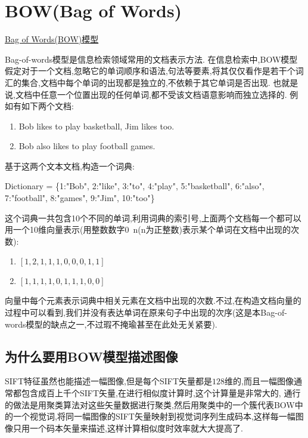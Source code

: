 \section{BOW(Bag of Words)}
\href{https://www.douban.com/note/310140053/}{Bag of Words(BOW)模型}

Bag-of-words模型是信息检索领域常用的文档表示方法. 在信息检索中,BOW模型假定对于一个文档,忽略它的单词顺序和语法,句法等要素,将其仅仅看作是若干个词汇的集合,文档中每个单词的出现都是独立的,不依赖于其它单词是否出现.
也就是说,文档中任意一个位置出现的任何单词,都不受该文档语意影响而独立选择的.
例如有如下两个文档:
\begin{enumerate}
	\item Bob likes to play basketball, Jim likes too.
	\item Bob also likes to play football games.
\end{enumerate}
基于这两个文本文档,构造一个词典:

Dictionary = \{1:"Bob", 2:"like", 3:"to", 4:"play", 5:"basketball", 6:"also", 7:"football", 8:"games", 9:"Jim", 10:"too"\}
 
这个词典一共包含10个不同的单词,利用词典的索引号,上面两个文档每一个都可以用一个10维向量表示(用整数数字0~n(n为正整数)表示某个单词在文档中出现的次数):
 
\begin{enumerate}
	\item $[1, 2, 1, 1, 1, 0, 0, 0, 1, 1]$
	\item $[1, 1, 1, 1 ,0, 1, 1, 1, 0, 0]$
\end{enumerate}
 
向量中每个元素表示词典中相关元素在文档中出现的次数.不过,在构造文档向量的过程中可以看到,我们并没有表达单词在原来句子中出现的次序(这是本Bag-of-words模型的缺点之一,不过瑕不掩瑜甚至在此处无关紧要).

\subsection{为什么要用BOW模型描述图像}
SIFT特征虽然也能描述一幅图像,但是每个SIFT矢量都是$128$维的,而且一幅图像通常都包含成百上千个SIFT矢量,在进行相似度计算时,这个计算量是非常大的,
通行的做法是用聚类算法对这些矢量数据进行聚类,然后用聚类中的一个簇代表BOW中的一个视觉词,将同一幅图像的SIFT矢量映射到视觉词序列生成码本,这样每一幅图像只用一个码本矢量来描述,这样计算相似度时效率就大大提高了.

